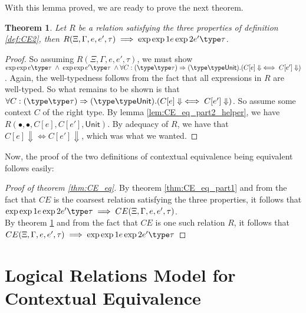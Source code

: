 \documentclass[twoside,11pt,openright]{report}
\newtheorem{theorem}{Theorem}
\theoremstyle{definition}
\newcommand{\expr}{e}
\newcommand{\ctx}{C}
\newcommand{\Tunit}{\mathsf{Unit}}
\newcommand{\typ}{\tau}
\newcommand{\venv}{\Gamma}
\newcommand{\tenv}{\Xi}
\newcommand{\empvenv}{\bullet}
\newcommand{\emptenv}{\bullet}
\newcommand{\jdg}[4]{#1 \; | \; #2 \; \vdash #3 : #4}
\newcommand{\jdgType}[3]{#1 \; | \; #2 \; \vdash #3}
\def\envs#1#2\exp#3\type#4{\jdg{#1}{#2}{#3}{#4}} %
\def\envstyp#1#2\type#3{\jdgType{#1}{#2}{#3}} %
\def\envscteq#1#2\exp1#3\exp2#4\type#5
\begin{document}
With this lemma proved, we are ready to prove the next theorem.
\begin{theorem}\label{thm:CE_eq_part2}
  Let $R$ be a relation satisfying the three properties of definition \ref{def:CE2}, then $R(\tenv, \venv, \expr, \expr', \typ) \implies \envscteq \tenv \venv \exp1 \expr \exp2 \expr' \type \typ$.
\end{theorem}
\begin{proof}
  So assuming $R(\tenv, \venv, \expr, \expr', \typ)$, we must show 
  $ \envs \tenv \venv \exp \expr \type \typ \; \land \;
    \envs \tenv \venv \exp \expr' \type \typ \; \land \forall \ctx : (\envstyp \tenv \venv \type \typ) \Rightarrow (\envstyp {\emptenv} {\empvenv} \type \Tunit) . (\ctx[\expr] \Downarrow \iff \ctx[\expr'] \Downarrow)$. Again, the well-typedness follows from the fact that all expressions in $R$ are well-typed. So what remains to be shown is that $\forall \ctx : (\envstyp \tenv \venv \type \typ) \Rightarrow (\envstyp {\emptenv} {\empvenv} \type \Tunit) . (\ctx[\expr] \Downarrow \iff \ctx[\expr'] \Downarrow)$. So assume some context $C$ of the right type. By lemma \ref{lem:CE_eq_part2_helper}, we have $R(\emptenv, \empvenv, C[\expr], C[\expr'], \Tunit)$. By adequacy of $R$, we have that $\ctx[\expr] \Downarrow \iff \ctx[\expr'] \Downarrow$, which was what we wanted.
\end{proof}

Now, the proof of the two definitions of contextual equivalence being equivalent follows easily:
\begin{proof}[Proof of theorem \ref{thm:CE_eq}]
  By theorem \ref{thm:CE_eq_part1} and from the fact that $CE$ is the coarsest relation satisfying the three properties, it follows that $\envscteq \tenv \venv \exp1 \expr \exp2 \expr' \type \typ \implies CE(\tenv, \venv, \expr, \expr', \typ)$.\\
  By theorem \ref{thm:CE_eq_part2} and from the fact that $CE$ is one such relation $R$, it follows that $CE(\tenv, \venv, \expr, \expr', \typ) \implies \envscteq \tenv \venv \exp1 \expr \exp2 \expr' \type \typ$
\end{proof}


\chapter{Logical Relations Model for Contextual Equivalence}
\label{ch:LR}
\end{document}
